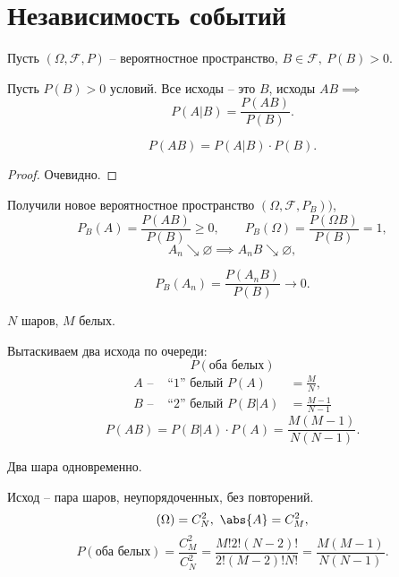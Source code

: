 

\section{Независимость событий}

Пусть $(\Omega,\mathcal{F},P)$ -- вероятностное пространство, $B \in \mathcal{F}, \ P(B) > 0$.

\begin{definition}
  Пусть $P(B)>0$ условий. Все исходы -- это $B$, исходы $AB \implies$
  \[
    P(A|B) = \frac{P(AB)}{P(B)}.
  \]
  \begin{figure}[H]
    \centering
    \label{fig:fig-10}
  \end{figure}
\end{definition}

\begin{theorem}
  \[
    P(AB) = P(A|B)\cdot P(B).
  \]
\end{theorem}

\begin{proof}
  Очевидно.
\end{proof}

Получили новое вероятностное пространство $(\Omega,\mathcal{F},P_B))$,
\[
  P_B(A) = \frac{P(AB)}{P(B)}\geqslant 0, \qquad P_B(\Omega) = \frac{P(\Omega B)}{P(B)} = 1,
\]
\[
  A_n \searrow \varnothing \implies A_nB \searrow \varnothing,
\]

\[
  P_B(A_n) = \frac{P(A_nB)}{P(B)} \rightarrow 0.
\]

\begin{eg}
  $N$ шаров, $M$ белых.

  Вытаскиваем два исхода по очереди:
  \[
    P(\text{оба белых})
  \]
  \[
    \begin{array}{lcl}
      A \text{ -- }& \text{``1'' белый }P(A)&=\frac{M}{N}, \\
      B \text{ -- }& \text{``2'' белый }P(B|A)&=\frac{M-1}{N-1}
    \end{array}
  \]
  \[
    P(AB) = P(B|A)\cdot P(A)=\frac{M(M-1)}{N(N-1)}.
  \]
\end{eg}

\begin{eg}
  Два шара одновременно.

  Исход -- пара шаров, неупорядоченных, без повторений.
  \[
    (\Omega) = C_{N}^{2}, \ \abs{A} = C_{M}^{2},
  \]
  \[
    P(\text{оба белых}) = \frac{C_{M}^{2}}{C_{N}^{2}} = \frac{M!2!(N-2)!}{2!(M-2)!N!} = \frac{M(M-1)}{N(N-1)}.
  \]
\end{eg}

